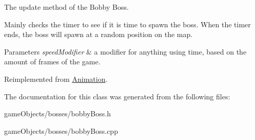 The update method of the Bobby Boss. 

Mainly checks the timer to see if it is time to spawn the boss. When the timer ends, the boss will spawn at a random position on the map. 
\begin{DoxyParams}{Parameters}
{\em speed\+Modifier} & a modifier for anything using time, based on the amount of frames of the game. \\
\hline
\end{DoxyParams}


Reimplemented from \hyperlink{class_animation_ae17ebf5f4b47801e460eb63342d858e8}{Animation}.



The documentation for this class was generated from the following files\+:\begin{DoxyCompactItemize}
\item 
game\+Objects/bosses/bobby\+Boss.\+h\item 
game\+Objects/bosses/bobby\+Boss.\+cpp\end{DoxyCompactItemize}
